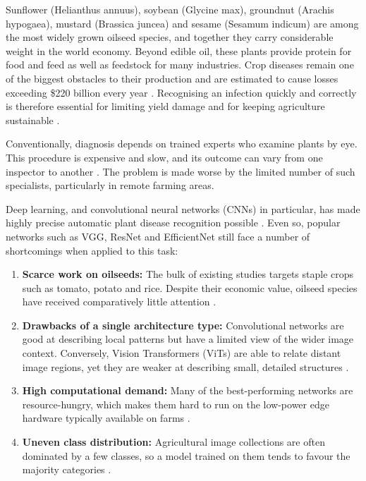 \documentclass[default, iicol]{sn-jnl}
\theoremstyle{thmstyleone}%
\theoremstyle{thmstyletwo}%
\theoremstyle{thmstylethree}%
\begin{document}
Sunflower (Helianthus annuus), soybean (Glycine max), groundnut (Arachis hypogaea), mustard (Brassica juncea) and sesame (Sesamum indicum) are among the most widely grown oilseed species, and together they carry considerable weight in the world economy. Beyond edible oil, these plants provide protein for food and feed as well as feedstock for many industries. Crop diseases remain one of the biggest obstacles to their production and are estimated to cause losses exceeding \$220 billion every year \cite{shafay2025recent}. Recognising an infection quickly and correctly is therefore essential for limiting yield damage and for keeping agriculture sustainable \cite{zainab2025plant}.

Conventionally, diagnosis depends on trained experts who examine plants by eye. This procedure is expensive and slow, and its outcome can vary from one inspector to another \cite{bouacida2025innovative}. The problem is made worse by the limited number of such specialists, particularly in remote farming areas.

Deep learning, and convolutional neural networks (CNNs) in particular, has made highly precise automatic plant disease recognition possible \cite{mohanty2016using,shaheed2023efficientrmtnet}. Even so, popular networks such as VGG, ResNet and EfficientNet still face a number of shortcomings when applied to this task:

\begin{enumerate}
\item \textbf{Scarce work on oilseeds:} The bulk of existing studies targets staple crops such as tomato, potato and rice. Despite their economic value, oilseed species have received comparatively little attention \cite{sara2022sunflower}.

\item \textbf{Drawbacks of a single architecture type:} Convolutional networks are good at describing local patterns but have a limited view of the wider image context. Conversely, Vision Transformers (ViTs) are able to relate distant image regions, yet they are weaker at describing small, detailed structures \cite{li2023pmvt,khan2023hybrid}.

\item \textbf{High computational demand:} Many of the best-performing networks are resource-hungry, which makes them hard to run on the low-power edge hardware typically available on farms \cite{huang2023knowledge}.

\item \textbf{Uneven class distribution:} Agricultural image collections are often dominated by a few classes, so a model trained on them tends to favour the majority categories
\cite{gnanasekaran2020cassava}.
\end{enumerate}
\end{document}
